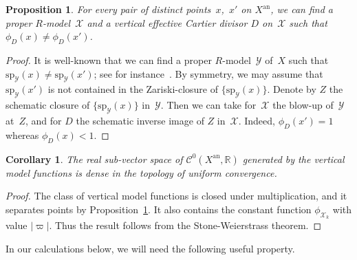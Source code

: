 \documentclass[11pt]{article}
\let\mathcal\mathscr
\newtheorem{prop}[equation]{Proposition}
\newtheorem{cor}[equation]{Corollary}
\theoremstyle{definition}
\numberwithin{equation}{subsection}
\newcommand{\R}{\ensuremath{\mathbb{R}}}
\newcommand{\cX}{\ensuremath{\mathscr{X}}}
\newcommand{\cY}{\ensuremath{\mathscr{Y}}}
\newcommand{\an}{\mathrm{an}}
\newcommand{\spe}{\mathrm{sp}}
\let\unif\varpi
\begin{document}
\begin{prop}\label{prop:test}
For every pair of distinct points~$x$,~$x'$ on $X^{\an}$, we can find a proper $R$\nobreakdash-model~$\cX$ and a vertical effective Cartier divisor $D$ on~$\cX$ such that $\phi_D(x)\neq \phi_D(x')$.
\end{prop}
\begin{proof}
It is well-known that we can find a proper $R$\nobreakdash-model~$\cY$ of~$X$ such that $\spe_{\cY}(x)\neq \spe_{\cY}(x')$; see for instance~\cite[2.3.2]{MuNi}.
By symmetry, we may assume that $\spe_{\cY}(x')$ is not contained in the Zariski-closure of $\{\spe_{\cY}(x)\}$. Denote by $Z$ the schematic closure of $\{\spe_{\cY}(x)\}$ in~$\cY$. Then we can take for~$\cX$ the blow-up of~$\cY$ at~$Z$, and for $D$ the schematic inverse image of $Z$ in~$\cX$. Indeed, $\phi_D(x')=1$ whereas $\phi_D(x)<1$.
\end{proof}
\begin{cor}\label{cor:stone}
The real sub-vector space of $\mathcal{C}^0(X^{\an},\R)$ generated by the vertical model functions
is dense in the topology of uniform convergence.
\end{cor}
\begin{proof}
The class of vertical model functions is closed under multiplication, and it separates points by
Proposition~\ref{prop:test}. It also contains the constant function $\phi_{\cX_k}$ with value $|\unif|$.
Thus the result follows from the Stone-Weierstrass theorem.
\end{proof}

In our calculations below, we will need the following useful property.
\end{document}
